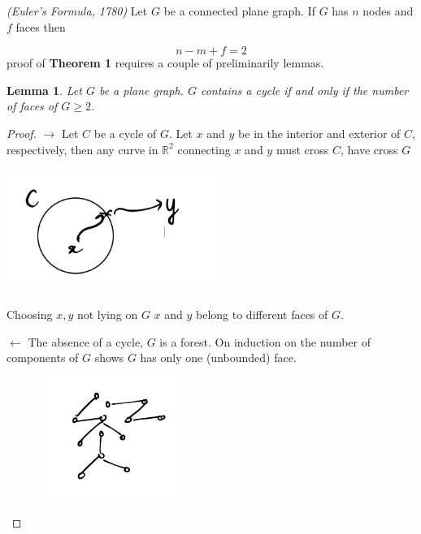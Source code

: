\documentclass[12pt]{article}
\newenvironment{theorem}[1]{%
  \renewcommand\themanualtheoreminner{#1}%
  \manualtheoreminner
}{\endmanualtheoreminner}
\newtheorem*{lemma}{Lemma}
\newenvironment{pro}{\begin{proof}}{\end{proof}}
\begin{document}
\begin{theorem}{1}
	\textit{(Euler's Formula, 1780)} Let $G$ be a connected plane graph. If $G$ has $n$ nodes and $f$ faces then

	\[n - m + f = 2\]
	proof of \textbf{Theorem 1} requires a couple of preliminarily lemmas.
\end{theorem}

\begin{lemma}
	Let $G$ be a plane graph. $G$ contains a cycle if and only if the number of faces of $G \ge 2$.
\end{lemma}

\begin{pro}
	$\rightarrow$ Let $C$ be a cycle of $G$. Let $x$ and $y$ be in the interior and exterior of $C$, respectively, then any curve in $\mathbb{R}^{2}$ connecting $x$ and $y$ must cross $C$, have cross $G$

	\begin{center}
		\includegraphics[width=7cm,height=4cm]{circle_proof}
	\end{center}

	Choosing $x, y$ not lying on $G$ $x$ and $y$ belong to different faces of $G$.

	$\leftarrow$ The absence of a cycle, $G$ is a forest. On induction on the number of components of $G$ shows $G$ has only one (unbounded) face.

	\begin{center}
		\includegraphics[width=7cm,height=4cm]{circle_proof2}
	\end{center}

\end{pro}
\end{document}
